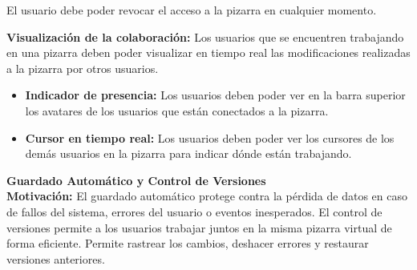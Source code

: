 \documentclass[a4paper, oneside, final]{scrartcl}
\begin{document}
El usuario debe poder revocar el acceso a la pizarra en cualquier momento.

\textbf{Visualización de la colaboración:} Los usuarios que se encuentren trabajando en una pizarra deben poder visualizar en tiempo real las modificaciones realizadas a la pizarra por otros usuarios.

\begin{itemize}
    \item \textbf{Indicador de presencia:} Los usuarios deben poder ver en la barra superior los avatares de los usuarios que están conectados a la pizarra.
    \item \textbf{Cursor en tiempo real:} Los usuarios deben poder ver los cursores de los demás usuarios en la pizarra para indicar dónde están trabajando.
\end{itemize}


\noindent
\textbf{\large Guardado Automático y Control de Versiones}\\ %

  \textbf{Motivación: }El guardado automático protege contra la pérdida de datos en caso de fallos del sistema, errores del usuario o eventos inesperados. El control de versiones permite a los usuarios trabajar juntos en la misma pizarra virtual de forma eficiente. Permite rastrear los cambios, deshacer errores y restaurar versiones anteriores. 
\end{document}
